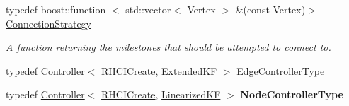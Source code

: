 \begin{DoxyCompactItemize}
\item 
\hypertarget{class_f_i_r_m_a15cfbcaf52c0bdd5e6c1a969bbf7ea1e}{typedef boost\-::function\*
$<$ std\-::vector$<$ \-Vertex $>$\*
 \&(const \-Vertex)$>$ \hyperlink{class_f_i_r_m_a15cfbcaf52c0bdd5e6c1a969bbf7ea1e}{\-Connection\-Strategy}}\label{class_f_i_r_m_a15cfbcaf52c0bdd5e6c1a969bbf7ea1e}

\begin{DoxyCompactList}\small\item\em \-A function returning the milestones that should be attempted to connect to. \end{DoxyCompactList}\item 
typedef \hyperlink{class_controller}{\-Controller}$<$ \hyperlink{class_r_h_c_i_create}{\-R\-H\-C\-I\-Create}, \*
\hyperlink{class_extended_k_f}{\-Extended\-K\-F} $>$ \hyperlink{class_f_i_r_m_a70abcb24fbc9f836b94119f65c8f8a37}{\-Edge\-Controller\-Type}
\item 
\hypertarget{class_f_i_r_m_adf37596ffd4dbf633d7cd0f27347d15c}{typedef \hyperlink{class_controller}{\-Controller}$<$ \hyperlink{class_r_h_c_i_create}{\-R\-H\-C\-I\-Create}, \*
\hyperlink{class_linearized_k_f}{\-Linearized\-K\-F} $>$ {\bfseries \-Node\-Controller\-Type}}\label{class_f_i_r_m_adf37596ffd4dbf633d7cd0f27347d15c}

\end{DoxyCompactItemize}

